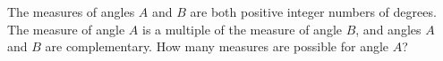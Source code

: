 The measures of angles $A$ and $B$ are both positive integer numbers of degrees. The measure of angle $A$ is a multiple of the measure of angle $B$, and angles $A$ and $B$ are complementary. How many measures are possible for angle $A$?
